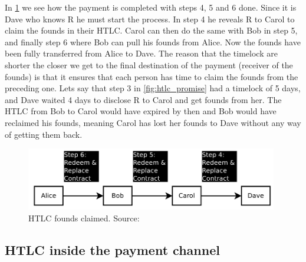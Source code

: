 In \cref{fig:htlc_settle} we see how the payment is completed with steps 4, 5 and 6 done. Since it is Dave who knows R he must start the process. In step 4 he reveals R to Carol to claim the founds in their HTLC. Carol can then do the same with Bob in step 5, and finally step 6 where Bob can pull his founds from Alice.
Now the founds have been fully transferred from Alice to Dave.
The reason that the timelock are shorter the closer we get to the final destination of the payment (receiver of the founds) is that it ensures that each person has time to claim the founds from the preceding one. Lets say that step 3 in \cref{fig:htlc_promise} had a timelock of 5 days, and Dave waited 4 days to disclose R to Carol and get founds from her. The HTLC from Bob to Carol would have expired by then and Bob would have reclaimed his founds, meaning Carol has lost her founds to Dave without any way of getting them back.

\begin{figure}[h]
    \centering
    \includegraphics[width=11cm]{figures/htlc_settle.png}
    \caption{HTLC founds claimed. Source: \cite{poon2015bitcoin}}
    \label{fig:htlc_settle}
\end{figure}


\subsection{HTLC inside the payment channel}
\label{subsec:htlcln}

